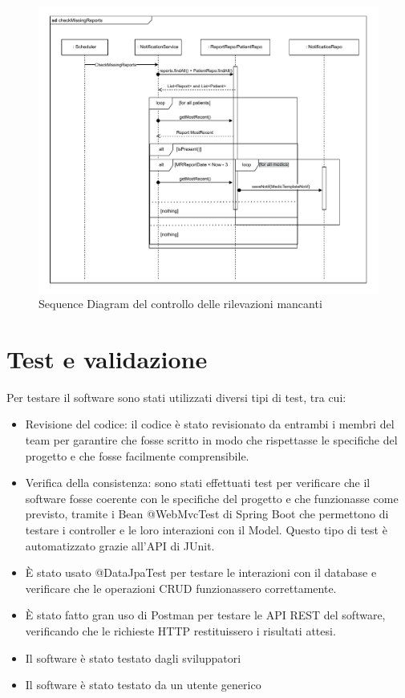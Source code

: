 \documentclass[a4paper]{article}
\begin{document}
\begin{figure}[H]
  \begin{center}
    \includegraphics[width=1\textwidth]{checkMissingReports.pdf}
  \end{center}
  \caption{Sequence Diagram del controllo delle rilevazioni mancanti}  
\end{figure}
\noindent

\pagebreak

\section{Test e validazione}

Per testare il software sono stati utilizzati diversi tipi di test, tra cui:
\begin{itemize}
  \item Revisione del codice: il codice è stato revisionato da entrambi i membri del team per garantire che fosse scritto 
  in modo che rispettasse le specifiche del progetto e che fosse facilmente comprensibile.
  \item Verifica della consistenza: sono stati effettuati test per verificare che il software fosse coerente con le specifiche del progetto e che
  funzionasse come previsto, tramite i Bean @WebMvcTest di Spring Boot che permettono di testare i controller e le loro interazioni con il Model.
  Questo tipo di test è automatizzato grazie all'API di JUnit. 
  \item È stato usato @DataJpaTest per testare le interazioni con il database e verificare che le operazioni CRUD funzionassero correttamente.
  \item È stato fatto gran uso di Postman per testare le API REST del software, verificando che le richieste HTTP restituissero i risultati attesi.
  \item Il software è stato testato dagli sviluppatori
  \item Il software è stato testato da un utente generico
\end{itemize}
\end{document}
